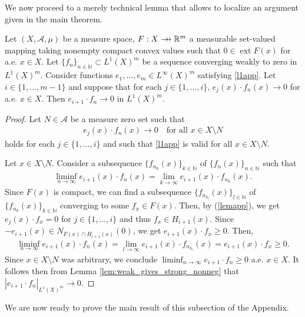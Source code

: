 \documentclass[hidelinks,onefignum,onetabnum]{siamart220329}
\newcommand{\rrightarrow}{\mathrel{\mathrlap{\rightarrow}\mkern1mu\rightarrow}}
\let\twoheadrightarrow\rrightarrow
\newcommand{\ext}{\operatorname{ext}}
\begin{document}
We now proceed to a merely technical lemma that allows to localize an argument given in the main theorem. 


\begin{lemma}\label{preplemapp}
	Let $(X,\mathcal A,\mu )$ be a measure space,  $F:X\twoheadrightarrow \mathbb R^m$ a measurable set-valued mapping taking nonempty compact convex values such that $0\in\ext{F(x)}$ for a.e. $x\in X$. Let $\{f_{n}\}_{n\in\mathbb N}\subset {L^1(X)^m}$ be a sequence converging weakly to zero in ${L^1(X)^m}$.  Consider functions $e_1,\dots,e_m\in {L^\infty(X)^m}$ satisfying \cref{l1app}.
	 Let $i\in\{1,\dots,m-1\}$ and suppose that for each $j\in\{1,\dots,i\}$, $e_{j}(x)\cdot f_{n}(x)\to 0$ for a.e. $x\in X$.  Then $e_{i+1}\cdot f_n\to 0$ in ${L^1(X)^m}$.
\end{lemma}
\begin{proof}
	Let $N\in\mathcal A$ be a measure zero set such that 
			\begin{align}\label{lemapp}
			e_{j}(x)\cdot f_n(x)\to 0\quad\text{for all $x\in X\setminus N$}
		\end{align}
	holds for each $j\in\{1,\dots,i\}$ and such that
	\eqref{l1app} is valid for all $x \in X \setminus N$. 
	
	Let $x\in X\setminus N$. Consider a subsequence $\{f_{n_k}(x)\}_{k\in\mathbb N}$ of $\{f_n(x)\}_{n\in\mathbb N}$ such that 
	\begin{align*}
			\liminf_{n\to\infty}e_{i+1}(x)\cdot f_{n}(x)=\lim_{k\to\infty} e_{i+1}(x)\cdot f_{n_k}(x).
	\end{align*}
	Since $F(x)$ is compact, we can find a subsequence $\{f_{n_{k_{l}}}(x)\}_{l\in\mathbb N}$ of $\{f_{n_k}(x)\}_{k\in\mathbb N}$ converging to some $f_x\in F(x)$. Then, by (\ref{lemapp}), we get $e_{j}(x)\cdot f_x=0$ for $j\in\{1,\dots, i\}$ and thus $f_x\in H_{i+1}(x)$. Since $-e_{i+1}(x)\in N_{F(x)\cap H_{i+1}(x)}(0)$, we get $e_{i+1}(x)\cdot f_x\ge 0$. Then, 
	\begin{align*}
		\liminf_{n\to\infty}e_{i+1}(x)\cdot f_{n}(x)=\lim_{l\to\infty} e_{i+1}(x)\cdot f_{n_{k_l}}(x)=e_{i+1}(x)\cdot f_x\ge 0.
	\end{align*}
	Since $x\in X\setminus N$ was arbitrary, we conclude  $\liminf_{n\to\infty}e_{i+1}\cdot f_{n}\ge0$ a.e. $x\in X$.
	It follows then from Lemma \ref{lem:weak_gives_strong_nonneg} that $|e_{i+1}\cdot f_n|_{{L^1(X)^m}}\to 0$.
\end{proof}

We are now ready to prove the main result of this subsection of the Appendix. 
\end{document}
